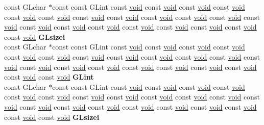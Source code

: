 \begin{DoxyCompactItemize}
\begin{tabbing}
\>const GLchar $\ast$const const GLint const \hyperlink{interfacevoid}{void} const \hyperlink{interfacevoid}{void} const \hyperlink{interfacevoid}{void} const \hyperlink{interfacevoid}{void} const \hyperlink{interfacevoid}{void} const \hyperlink{interfacevoid}{void} const \hyperlink{interfacevoid}{void} const \hyperlink{interfacevoid}{void} const \hyperlink{interfacevoid}{void} const \hyperlink{interfacevoid}{void} const \hyperlink{interfacevoid}{void} const \hyperlink{interfacevoid}{void} const \hyperlink{interfacevoid}{void} const \hyperlink{interfacevoid}{void} const \hyperlink{interfacevoid}{void} const \hyperlink{interfacevoid}{void} const \hyperlink{interfacevoid}{void} const \hyperlink{interfacevoid}{void} const \hyperlink{interfacevoid}{void} const \hyperlink{interfacevoid}{void} {\bfseries GLsizei}\\
\>const GLchar $\ast$const const GLint const \hyperlink{interfacevoid}{void} const \hyperlink{interfacevoid}{void} const \hyperlink{interfacevoid}{void} const \hyperlink{interfacevoid}{void} const \hyperlink{interfacevoid}{void} const \hyperlink{interfacevoid}{void} const \hyperlink{interfacevoid}{void} const \hyperlink{interfacevoid}{void} const \hyperlink{interfacevoid}{void} const \hyperlink{interfacevoid}{void} const \hyperlink{interfacevoid}{void} const \hyperlink{interfacevoid}{void} const \hyperlink{interfacevoid}{void} const \hyperlink{interfacevoid}{void} const \hyperlink{interfacevoid}{void} const \hyperlink{interfacevoid}{void} const \hyperlink{interfacevoid}{void} const \hyperlink{interfacevoid}{void} const \hyperlink{interfacevoid}{void} const \hyperlink{interfacevoid}{void} const \hyperlink{interfacevoid}{void} {\bfseries GLint}\\
\>const GLchar $\ast$const const GLint const \hyperlink{interfacevoid}{void} const \hyperlink{interfacevoid}{void} const \hyperlink{interfacevoid}{void} const \hyperlink{interfacevoid}{void} const \hyperlink{interfacevoid}{void} const \hyperlink{interfacevoid}{void} const \hyperlink{interfacevoid}{void} const \hyperlink{interfacevoid}{void} const \hyperlink{interfacevoid}{void} const \hyperlink{interfacevoid}{void} const \hyperlink{interfacevoid}{void} const \hyperlink{interfacevoid}{void} const \hyperlink{interfacevoid}{void} const \hyperlink{interfacevoid}{void} const \hyperlink{interfacevoid}{void} const \hyperlink{interfacevoid}{void} const \hyperlink{interfacevoid}{void} const \hyperlink{interfacevoid}{void} const \hyperlink{interfacevoid}{void} const \hyperlink{interfacevoid}{void} const \hyperlink{interfacevoid}{void} {\bfseries GLsizei}\\

\end{tabbing}
\end{DoxyCompactItemize}
